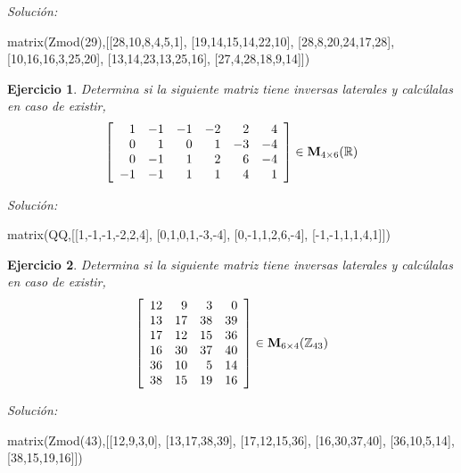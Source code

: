 \documentclass{amsart}
\newtheorem{ejer}{Ejercicio}
\begin{document}
{\it Soluci\'on:}

\begin{sageblock}
matrix(Zmod(29),[[28,10,8,4,5,1],
[19,14,15,14,22,10],
[28,8,20,24,17,28],
[10,16,16,3,25,20],
[13,14,23,13,25,16],
[27,4,28,18,9,14]])
\end{sageblock}



\begin{ejer} Determina si la siguiente matriz tiene inversas laterales y calc\'ulalas en caso de existir,
\[ \left[\begin{array}{rrrrrr}
1 & -1 & -1 & -2 & 2 & 4 \\
0 & 1 & 0 & 1 & -3 & -4 \\
0 & -1 & 1 & 2 & 6 & -4 \\
-1 & -1 & 1 & 1 & 4 & 1
\end{array}\right] \in {\bf M}_{4\times 6}({\mathbb R})\]
\end{ejer}

{\it Soluci\'on:}

\begin{sageblock}
matrix(QQ,[[1,-1,-1,-2,2,4],
[0,1,0,1,-3,-4],
[0,-1,1,2,6,-4],
[-1,-1,1,1,4,1]])
\end{sageblock}



\begin{ejer} Determina si la siguiente matriz tiene inversas laterales y calc\'ulalas en caso de existir,
\[ \left[\begin{array}{rrrr}
12 & 9 & 3 & 0 \\
13 & 17 & 38 & 39 \\
17 & 12 & 15 & 36 \\
16 & 30 & 37 & 40 \\
36 & 10 & 5 & 14 \\
38 & 15 & 19 & 16
\end{array}\right] \in {\bf M}_{6\times 4}({\mathbb Z}_{43})\]
\end{ejer}

{\it Soluci\'on:}

\begin{sageblock}
matrix(Zmod(43),[[12,9,3,0],
[13,17,38,39],
[17,12,15,36],
[16,30,37,40],
[36,10,5,14],
[38,15,19,16]])
\end{sageblock}

\end{document}
